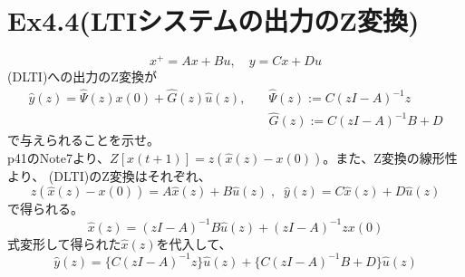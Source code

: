 \documentclass{jsarticle}
\begin{document}
\section*{Ex4.4(LTIシステムの出力のZ変換)}
\begin{equation}
  x^{+}=A x+B u, \quad y=C x+D u \tag{DLTI}
\end{equation}
(DLTI)への出力のZ変換が
\begin{equation}
  \begin{aligned}
    \hat{y}(z)=\hat{\Psi}(z) x(0)+\hat{G}(z) \hat{u}(z), \quad& \hat{\Psi}(z):=C(z I-A)^{-1}z\\
    & \hat{G}(z):=C(z I-A)^{-1} B+D 
  \end{aligned}
\end{equation}
で与えられることを示せ。
\;\\
p41のNote7より、$Z\left[x(t+1)\right] = z(\hat{x}(z)-x(0))$。また、Z変換の線形性より、
(DLTI)のZ変換はそれぞれ、
\begin{equation}
  z(\hat{x}(z)-x(0)) = A\hat{x}(z)+B\hat{u}(z)\;,\;\;
  \hat{y}(z) = C\hat{x}(z)+D\hat{u}(z)
\end{equation}
で得られる。
\begin{equation}
  \hat{x}(z) = {(zI-A)}^{-1}B\hat{u}(z)+{(zI-A)}^{-1}zx(0)
\end{equation}
式変形して得られた$\hat{x}(z)$を代入して、
\begin{equation}
  \hat{y}(z) = \{C(z I-A)^{-1}z\}\hat{u}(z) + \{C(z I-A)^{-1} B+D\}\hat{u}(z)
\end{equation}


\newpage
\end{document}
